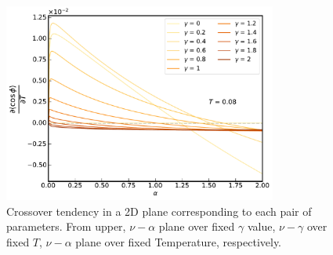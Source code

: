 \documentclass{article}[12pt]
\numberwithin{equation}{section}
\begin{document}
\begin{spacing}{1.5}
\begin{figure}[H]
  \centerline{\includegraphics[width=9cm]{TexFigure/4/4_3_11_2.pdf}}
  \caption{Crossover tendency in a 2D plane corresponding to each pair of parameters. From upper, $\nu - \alpha$ plane over fixed $\gamma$ value, $\nu - \gamma$ over fixed $T$, $\nu-\alpha$ plane over fixed Temperature, respectively.}
  \vfill
\end{figure}
\pagebreak
\newpage

\end{spacing}
\end{document}
